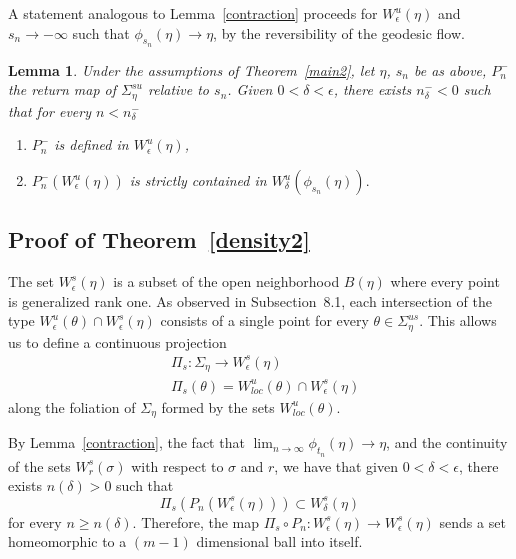 \documentclass[10pt]{amsart}
\newtheorem{lemm}[cdrthm]{Lemma}
\theoremstyle{definition}
\begin{document}
A statement analogous to Lemma~\ref{contraction} proceeds for $W^{u}_{\epsilon}(\eta)$ and $s_{n} \rightarrow -\infty$ such that $\phi_{s_{n}}(\eta) \rightarrow \eta$, by the reversibility of the geodesic flow.

\begin{lemm}\label{contraction2}
Under the assumptions of Theorem~\ref{main2}, let $\eta$, $s_{n}$ be as above, $P_{n}^{-}$ the return map of $\Sigma_{\eta}^{su}$ relative to $s_{n}$. Given $0 <\delta <\epsilon$, there exists $n_{\delta}^{-}<0$ such that for every $n <n_{\delta}^{-}$
\begin{enumerate}
\item \label{lemm8.4.1}$P_{n}^{-}$ is defined in $W^{u}_{\epsilon}(\eta)$,
\item \label{lemm8.4.2}$P_{n}^{-}(W^{u}_{\epsilon}(\eta))$ is strictly contained in $W^{u}_{\delta}(\phi_{s_{n}}(\eta)).$
\end{enumerate}
\end{lemm}


\subsection{Proof of Theorem~\ref{density2}}

The set $W^{s}_{\epsilon}(\eta)$ is a subset of the open neighborhood $B(\eta)$ where every point is generalized rank one. As observed in Subsection~8.1, each intersection of the type $W^{u}_{\epsilon} (\theta) \cap W^{s}_{\epsilon}(\eta)$ consists of a single point for every $\theta \in \Sigma_{\eta}^{us}$. This allows us to define a continuous projection
\begin{align*}
&\Pi_{s} : \Sigma_{\eta} \longrightarrow W^{s}_{\epsilon}(\eta)
\\
&\Pi_{s}(\theta) = W^{u}_{loc} (\theta) \cap W^{s}_{\epsilon}(\eta)
\end{align*}
along the foliation of $\Sigma_{\eta}$ formed by the sets $W^{u}_{loc}(\theta)$.


By Lemma~\ref{contraction}, the fact that $\lim_{n\rightarrow \infty}\phi_{t_{n}}(\eta) \rightarrow \eta$, and the continuity of the sets $W^{s}_{r}(\sigma)$ with respect to $\sigma$ and $r$, we have that given $0 < \delta <\epsilon$, there exists $ n(\delta)>0$ such that
\[
\Pi_{s}\left(P_{n}\left(W^{s}_{\epsilon}(\eta)\right)\right) \subset W^{s}_{\delta}(\eta)
\]
for every $ n \geq n(\delta)$. Therefore, the map $\Pi_{s} \circ P_{n} : W^{s}_{\epsilon}(\eta) \longrightarrow W^{s}_{\epsilon}(\eta)$ sends a set homeomorphic to a $(m-1)$ dimensional ball into itself.
\end{document}
